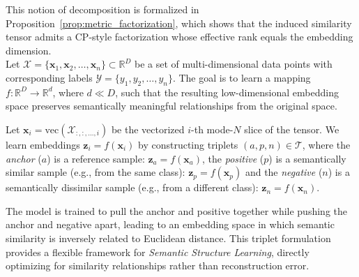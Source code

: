 \documentclass[a4paper,12pt,reqno]{amsart}
\theoremstyle{definition}
\theoremstyle{remark}
\begin{document}
	This notion of decomposition is formalized in Proposition~\ref{prop:metric_factorization}, which shows that the induced similarity tensor admits a CP-style factorization whose effective rank equals the embedding dimension.\\


Let $\mathcal{X} = \{\mathbf{x}_1, \mathbf{x}_2, \dots, \mathbf{x}_n\} \subset \mathbb{R}^D$ be a set of multi-dimensional data points with corresponding labels $\mathcal{Y} = \{y_1, y_2, \dots, y_n\}$. The goal is to learn a mapping $f: \mathbb{R}^D \to \mathbb{R}^d$, where $d \ll D$, such that the resulting low-dimensional embedding space preserves semantically meaningful relationships from the original space.

Let $\mathbf{x}_i = \text{vec}(\mathcal{X}_{:,:,\ldots,i})$ be the vectorized $i$-th mode-$N$ slice of the tensor. We learn embeddings $\mathbf{z}_i = f(\mathbf{x}_i)$ by constructing triplets $(a, p, n) \in \mathcal{T}$, where the \textit{anchor} ($a$) is a reference sample: $\mathbf{z}_a = f(\mathbf{x}_a)$, the \textit{positive} ($p$) is a semantically similar sample (e.g., from the same class): $\mathbf{z}_p = f(\mathbf{x}_p)$ and the \textit{negative} ($n$) is a semantically dissimilar sample (e.g., from a different class): $\mathbf{z}_n = f(\mathbf{x}_n)$.


The model is trained to pull the anchor and positive together while pushing the anchor and negative apart, leading to an embedding space in which semantic similarity is inversely related to Euclidean distance.
This triplet formulation provides a flexible framework for \textit{Semantic Structure Learning}, directly optimizing for similarity relationships rather than reconstruction error.
\end{document}
